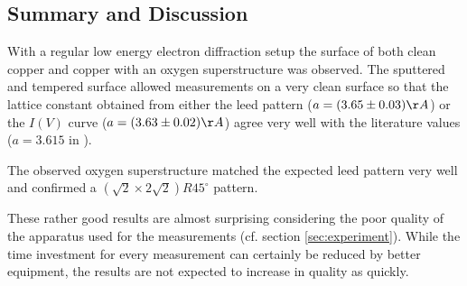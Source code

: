 \documentclass[a4paper]{scrartcl}
\numberwithin{equation}{section}
\numberwithin{figure}{section}
\numberwithin{table}{section}
\begin{document}
\subsection{Summary and Discussion}
With a regular low energy electron diffraction setup the surface of both clean copper and copper with an oxygen superstructure was observed. The sputtered and tempered surface allowed measurements on a very clean surface so that the lattice constant obtained from either the leed pattern ($a=(3.65\pm0.03)\AA$) or the $I(V)$ curve ($a=(3.63\pm0.02)\AA$) agree very well with the literature values ($a=3.615$ in \cite{straumanis}). %

The observed oxygen superstructure matched the expected leed pattern very well and confirmed a $(\sqrt{2} \times 2\sqrt{2})R45^\circ$ pattern.

These rather good results are almost surprising considering the poor quality of the apparatus used for the measurements (cf. section \ref{sec:experiment}). While the time investment for every measurement can certainly be reduced by better equipment, the results are not expected to increase in quality as quickly.

 

\end{document}
